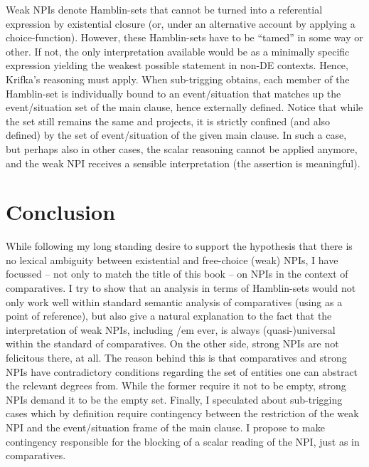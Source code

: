 \documentclass[output=paper,colorlinks,citecolor=brown,
]{langscibook}
\begin{document}
Weak NPIs denote Hamblin-sets that cannot be turned into a
referential expression by existential closure (or, under an alternative account by applying a choice-function).
However, these Hamblin-sets have to be “tamed” in some way or other. If not, the only interpretation available would be
as a minimally specific expression yielding the weakest possible statement in non-DE contexts. Hence, Krifka's reasoning must apply. When sub-trigging obtains, each member of the Hamblin-set is individually bound to an \mbox{event\slash situation} that matches up the \mbox{event\slash situation} set of the main clause,
hence externally defined. Notice that while the set still remains the same and projects, it is strictly confined (and
also defined) by the set of \mbox{event\slash situation} of the given main clause. In such a case, but perhaps also in other
cases, the scalar reasoning cannot be applied anymore, and the weak NPI receives a sensible interpretation (the
assertion is meaningful).

\section{Conclusion}\largerpage

While following my long standing desire to support the hypothesis that there is no lexical ambiguity between existential and free-choice (weak) NPIs, I have focussed -- not only to match the title of this book -- on NPIs in the context of comparatives. I try to show that an analysis in terms of Hamblin-sets would not only work well within standard semantic analysis of comparatives (using \citet{stechow1984} as a point of reference), but also give a natural explanation to the fact that the interpretation of weak NPIs, including {/em ever}, is always (quasi-)universal within the standard of comparatives. On the other side, strong NPIs are not felicitous there, at all. The reason behind this is that comparatives and strong NPIs have contradictory conditions regarding the set of entities one can abstract the relevant degrees from. While the former require it not to be empty, strong NPIs demand it to be the empty set. Finally, I speculated about sub-trigging cases which by definition require contingency between the restriction of the weak NPI and the event/situation frame of the main clause. I propose to make contingency responsible for the blocking of a scalar reading of the NPI, just as in comparatives.
\end{document}
